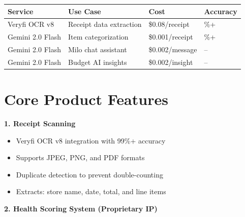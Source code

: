 \documentclass[11pt,a4paper]{report}
\begin{document}
\begin{center}
\renewcommand{\arraystretch}{1.4}
\begin{tabular}{>{\raggedright\arraybackslash}p{3.5cm} >{\raggedright\arraybackslash}p{4cm} >{\centering\arraybackslash}p{2.5cm} >{\centering\arraybackslash}p{3cm}}
\toprule
\rowcolor{miloprimary!15}
\textbf{Service} & \textbf{Use Case} & \textbf{Cost} & \textbf{Accuracy} \\
\midrule
Veryfi OCR v8 & Receipt data extraction & \$0.08/receipt & 99\%+ \\
\rowcolor{lightbg}
Gemini 2.0 Flash & Item categorization & \$0.001/receipt & 95\%+ \\
Gemini 2.0 Flash & Milo chat assistant & \$0.002/message & -- \\
\rowcolor{lightbg}
Gemini 2.0 Flash & Budget AI insights & \$0.002/insight & -- \\
\bottomrule
\end{tabular}
\end{center}

\section{Core Product Features}

\textbf{1. Receipt Scanning}
\begin{itemize}[leftmargin=2em, itemsep=3pt]
    \item Veryfi OCR v8 integration with 99\%+ accuracy
    \item Supports JPEG, PNG, and PDF formats
    \item Duplicate detection to prevent double-counting
    \item Extracts: store name, date, total, and line items
\end{itemize}

\textbf{2. Health Scoring System (Proprietary IP)}
\end{document}
